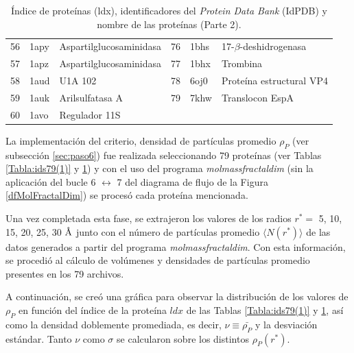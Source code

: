 \begin{table}[H]
\begin{footnotesize}
\begin{tabular}{||l|ll||l|ll||}
 				56  & 1apy  & Aspartilglucosaminidasa              & 76 & 1bhs  & 17-$\beta$-deshidrogenasa        \\
 				57  & 1apz  & Aspartilglucosaminidasa              & 77 & 1bhx  & Trombina                         \\
 				58  & 1aud  & U1A 102                              & 78 & 6oj0  & Proteína estructural VP4         \\
 				59  & 1auk  & Arilsulfatasa A                      & 79 & 7khw  & Translocon EspA                  \\
 				60  & 1avo  & Regulador 11S                        &    &       &  \\ \hline
 			\end{tabular}
 		\end{footnotesize}
 		\caption{Índice de proteínas (ldx), identificadores del \emph{Protein Data Bank} (IdPDB) y nombre de las proteínas (Parte 2).}
 		\label{Tabla:ids79(2)}
 	\end{table}
 
 	
 	La implementación del criterio, densidad de partículas 
 	promedio $\rho_{P}$ (ver subsección \ref{sec:paso6}) 
 	fue realizada seleccionando 79 proteínas 
 	(ver Tablas \ref{Tabla:ids79(1)} y \ref{Tabla:ids79(2)}) 
 	y con el uso del programa \emph{molmassfractaldim} 
 	(sin la aplicación del bucle 6 $\longleftrightarrow$ 7 
 	del diagrama de flujo de la Figura \ref{dfMolFractalDim}) 
 	se procesó cada proteína mencionada. 
 
 	Una vez completada esta fase, se extrajeron los valores 
 	de los radios $r^*{=}$ 5, 10, 15, 20, 25, 30 $\textup{\r{A}}$
 	 junto con el número de partículas promedio $\langle N(r^{*}) \rangle$ 
 	  de las datos generados a partir del programa \emph{molmassfractaldim}.
 	   Con esta información, se procedió al cálculo de volúmenes y densidades 
 	   de partículas promedio presentes en los 79 archivos. 
 	
 	
 	A continuación, se creó una gráfica para observar la distribución 
 	de los valores de $\rho_{P}$ en funci\'{o}n del \'{i}ndice de la 
 	prote\'{i}na $ldx$ de las Tablas \ref{Tabla:ids79(1)} y \ref{Tabla:ids79(2)},
 	 así como la densidad doblemente promediada, es decir, $\nu\equiv\bar{\rho_P}$ 
 	 y la desviaci\'{o}n est\'{a}ndar. Tanto $\nu$ como $\sigma$ se calcularon
 	  sobre los distintos $\rho_P(r^*)$.
 	
